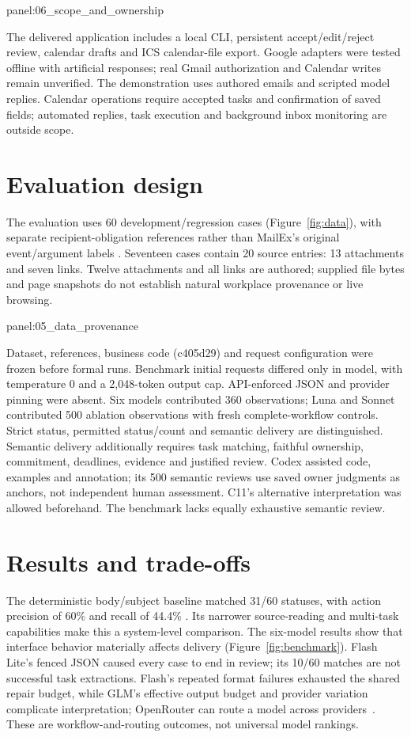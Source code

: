\documentclass[11pt,a4paper]{article}
\newcommand{\reportsection}[2]{\section*{#1}\label{#2}\addcontentsline{toc}{section}{#1}}
\newcommand{\reportfigure}[3]{\par\medskip\noindent\begin{minipage}{\linewidth}\captionsetup{type=figure}\centering\csname panel:#1\endcsname\caption{#2}\label{#3}\end{minipage}\par\medskip}
\newcommand{\reporttable}[3]{\par\medskip\noindent\begin{minipage}{\linewidth}\captionsetup{type=table}\centering\caption{#2}\label{#3}\smallskip\csname panel:#1\endcsname\end{minipage}\par\medskip}
\begin{document}
\reporttable{06_scope_and_ownership}{Ownership by layer. CLI: command-line interface; UI: user interface.}{tab:ownership}

The delivered application includes a local CLI, persistent accept/edit/reject review, calendar drafts and ICS calendar-file export. Google adapters were tested offline with artificial responses; real Gmail authorization and Calendar writes remain unverified. The demonstration uses authored emails and scripted model replies. Calendar operations require accepted tasks and confirmation of saved fields; automated replies, task execution and background inbox monitoring are outside scope.

\reportsection{Evaluation design}{sec:evaluation}
The evaluation uses 60 development/regression cases (Figure~\ref{fig:data}), with separate recipient-obligation references rather than MailEx's original event/argument labels \cite{mailex}. Seventeen cases contain 20 source entries: 13 attachments and seven links. Twelve attachments and all links are authored; supplied file bytes and page snapshots do not establish natural workplace provenance or live browsing.

\reportfigure{05_data_provenance}{Input origins and strict reference statuses (60 cases). Segment widths represent counts; each row totals 60.}{fig:data}

Dataset, references, business code (c405d29) and request configuration were frozen before formal runs. Benchmark initial requests differed only in model, with temperature 0 and a 2,048-token output cap. API-enforced JSON and provider pinning were absent. Six models contributed 360 observations; Luna and Sonnet contributed 500 ablation observations with fresh complete-workflow controls. Strict status, permitted status/count and semantic delivery are distinguished. Semantic delivery additionally requires task matching, faithful ownership, commitment, deadlines, evidence and justified review. Codex assisted code, examples and annotation; its 500 semantic reviews use saved owner judgments as anchors, not independent human assessment. C11's alternative interpretation was allowed beforehand. The benchmark lacks equally exhaustive semantic review.

\reportsection{Results and trade-offs}{sec:results}
The deterministic body/subject baseline matched 31/60 statuses, with action precision of 60\% and recall of 44.4\% \cite{experiment}. Its narrower source-reading and multi-task capabilities make this a system-level comparison. The six-model results show that interface behavior materially affects delivery (Figure~\ref{fig:benchmark}). Flash Lite's fenced JSON caused every case to end in review; its 10/60 matches are not successful task extractions. Flash's repeated format failures exhausted the shared repair budget, while GLM's effective output budget and provider variation complicate interpretation; OpenRouter can route a model across providers~\cite{routing}. These are workflow-and-routing outcomes, not universal model rankings.
\end{document}
